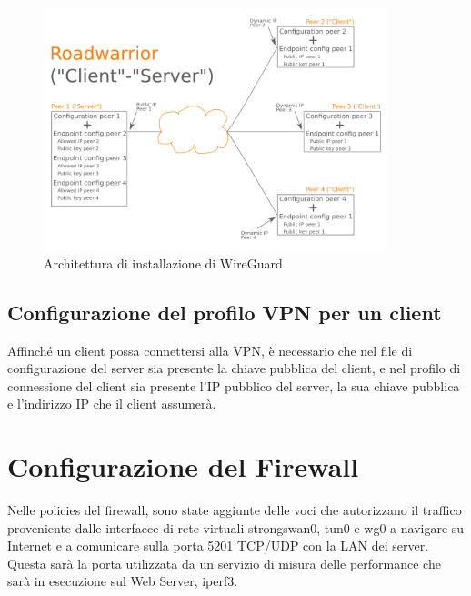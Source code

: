 \begin{figure}[ht]
    \centering
    \includegraphics[width=10cm]{figure/Wireguard-roadwarrior.png}
    \caption{Architettura di installazione di WireGuard}
\end{figure}


\subsection{Configurazione del profilo VPN per un client}
Affinché un client possa connettersi alla VPN, è necessario che nel file di configurazione del server sia presente la chiave pubblica del client, e nel profilo di connessione del client sia presente l'IP pubblico del server, la sua chiave pubblica e l'indirizzo IP che il client assumerà.

\section{Configurazione del Firewall}
Nelle policies del firewall, sono state aggiunte delle voci che autorizzano il traffico proveniente dalle interfacce di rete virtuali strongswan0, tun0 e wg0 a navigare su Internet e a comunicare sulla porta 5201 TCP/UDP con la LAN dei server. Questa sarà la porta utilizzata da un servizio di misura delle performance che sarà in esecuzione sul Web Server, iperf3.